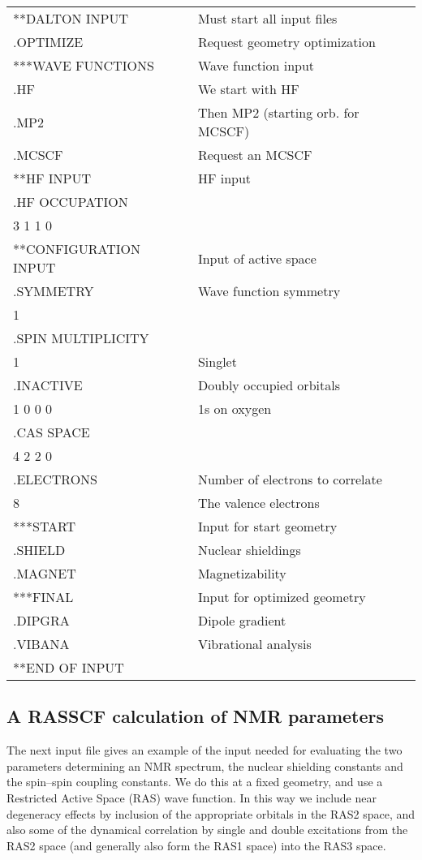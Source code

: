 {\ttfamily
\begin{tabular}{ll}
**DALTON INPUT\hspace{3cm} & Must start all input files\\
.OPTIMIZE & Request geometry optimization\\
***WAVE FUNCTIONS & Wave function input\\
.HF & We start with HF\\
.MP2 & Then MP2 (starting orb. for MCSCF)\\
.MCSCF & Request an MCSCF\\
**HF INPUT & HF input\\
.HF OCCUPATION\\
 3 1 1 0\\
**CONFIGURATION INPUT & Input of active space\\
.SYMMETRY & Wave function symmetry\\
 1\\
.SPIN MULTIPLICITY\\
 1 & Singlet\\
.INACTIVE & Doubly occupied orbitals\\
 1 0 0 0 & 1s on oxygen\\
.CAS SPACE\\
 4 2 2 0\\
.ELECTRONS & Number of electrons to correlate\\
 8 & The valence electrons\\
***START & Input for start geometry\\
.SHIELD & Nuclear shieldings\\
.MAGNET & Magnetizability\\
***FINAL & Input for optimized geometry\\
.DIPGRA & Dipole gradient\\
.VIBANA & Vibrational analysis\\
**END OF INPUT\\
\end{tabular}}

\subsection{A RASSCF calculation of NMR parameters}

The next input file gives an example of the input needed for
evaluating the two parameters determining an NMR spectrum, the nuclear
shielding constants and the spin--spin
coupling constants. We do this
at a fixed geometry, and use a Restricted Active Space (RAS) wave
function. In this way we include near degeneracy effects by inclusion
of the appropriate orbitals in the RAS2 space, and also some of the
dynamical correlation  by single and
double excitations
from the RAS2 space (and generally also form the RAS1 space) into the
RAS3 space.

